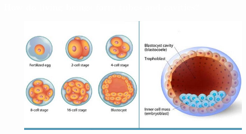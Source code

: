 \documentclass{beamer}
\begin{document}
\begin{frame}
\frametitle{\textcolor{white}{How do living beings form tubes and cavities?}}

\begin{figure}
\includegraphics[scale=0.5]{blastocyst.jpg}
\end{figure}


\end{frame}
\end{document}

